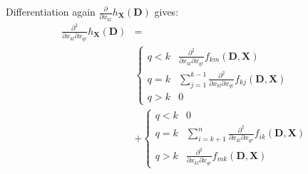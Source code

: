 \documentclass[a4paper,12pt]{article}
\begin{document}
Differentiation again $ \frac{\partial}{\partial x_{kl}} h_{\bm{X}}(\bm{D})$ gives:
\begin{equation}
\begin{aligned}
    \frac{\partial^2}{\partial x_{kl} \partial x_{qr}} h_{\bm{X}}(\bm{D}) &=
    \\ &\begin{cases}
    q < k & \frac{\partial^2}{\partial x_{kl} \partial x_{qr}}f_{km}(\bm{D}, \bm{X})\\
    q = k & \sum_{j=1}^{k-1} \frac{\partial^2}{\partial x_{kl} \partial x_{qr}}f_{kj}(\bm{D}, \bm{X}) \\
    q > k & 0
    \end{cases} 
    \\ & + \begin{cases}
        q < k & 0 \\
        q = k & \sum_{i=k+1}^{n} \frac{\partial^2}{\partial x_{kl} \partial x_{qr}}f_{ik}(\bm{D}, \bm{X}) \\
        q > k & \frac{\partial^2}{\partial x_{kl} \partial x_{qr}}f_{mk}(\bm{D}, \bm{X})
    \end{cases}
    \end{aligned}
\end{equation}
\end{document}
